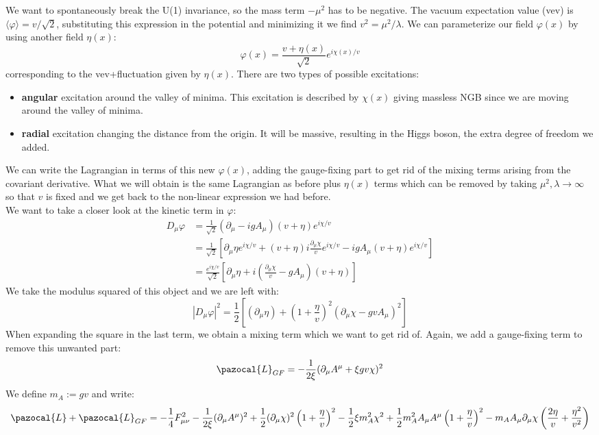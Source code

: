 \documentclass[../main.tex]{subfiles}
\begin{document}
We want to spontaneously break the U(1) invariance, so the mass term $-\mu^2$ has to be negative. The vacuum expectation value (vev) is $\langle\varphi\rangle=v/\sqrt{2}$, substituting this expression in the potential and minimizing it we find $v^2=\mu^2/\lambda$. We can parameterize our field $\varphi(x)$ by using another field $\eta(x)$:
\[
\varphi(x)=\frac{v+\eta(x)}{\sqrt{2}}e^{i\chi(x)/v}
\]
corresponding to the vev+fluctuation given by $\eta(x)$. There are two types of possible excitations:
\begin{itemize}
    \item \textbf{angular} excitation around the valley of minima. This excitation is described by $\chi(x)$ giving massless NGB since we are moving around the valley of minima.
    \item \textbf{radial} excitation changing the distance from the origin. It will be massive, resulting in the Higgs boson, the extra degree of freedom we added.
\end{itemize}
We can write the Lagrangian in terms of this new $\varphi(x)$, adding the gauge-fixing part to get rid of the mixing terms arising from the covariant derivative. What we will obtain is the same Lagrangian as before plus $\eta(x)$ terms which can be removed by taking $\mu^2,\lambda\to\infty$ so that $v$ is fixed and we get back to the non-linear expression we had before.\\
We want to take a closer look at the kinetic term in $\varphi$:
\begin{align*}
D_\mu\varphi&=\frac{1}{\sqrt{2}}(\partial_\mu-igA_\mu)(v+\eta)e^{i\chi/v}\\
&=\frac{1}{\sqrt{2}}\left[\partial_\mu\eta e^{i\chi/v}+(v+\eta)i\frac{\partial_\mu\chi}{v}e^{i\chi/v}-igA_\mu(v+\eta)e^{i\chi/v}\right]\\
&=\frac{e^{i\chi/v}}{\sqrt{2}}\left[\partial_\mu\eta+i\left(\frac{\partial_\mu\chi}{v}-gA_\mu\right)(v+\eta)\right]
\end{align*}
We take the modulus squared of this object and we are left with:
\[
|D_\mu\varphi|^2=\frac{1}{2}\left[(\partial_\mu\eta)+\left(1+\frac{\eta}{v}\right)^2(\partial_\mu\chi-gvA_\mu)^2\right]
\]
When expanding the square in the last term, we obtain a mixing term which we want to get rid of. Again, we add a gauge-fixing term to remove this unwanted part:
\[
\pazocal{L}_{GF}=-\frac{1}{2\xi}(\partial_\mu A^\mu+\xi gv\chi)^2
\]
We define $m_A:=gv$ and write:
\[
\pazocal{L}+\pazocal{L}_{GF}=-\frac{1}{4}F_{\mu\nu}^2-\frac{1}{2\xi}(\partial_\mu A^\mu)^2+\frac{1}{2}(\partial_\mu\chi)^2\left(1+\frac{\eta}{v}\right)^2-\frac{1}{2}\xi m_A^2\chi^2+\frac{1}{2}m_A^2A_\mu A^\mu\left(1+\frac{\eta}{v}\right)^2-m_AA_\mu\partial_\mu\chi\left(\frac{2\eta}{v}+\frac{\eta^2}{v^2}\right)
\]
\end{document}
